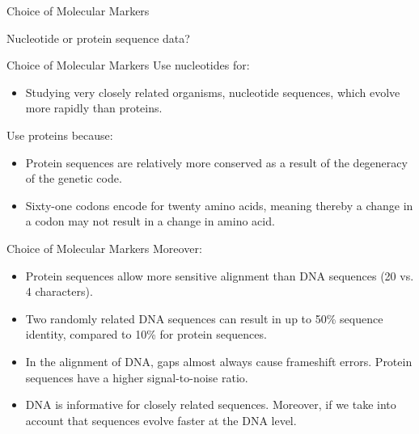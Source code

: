 \documentclass[10pt]{beamer}
\newcommand{\1}{
	\setbeamertemplate{background}{
		\texttt{[image: img/1]}
		\tikz[overlay] \fill[fill opacity=0.75,fill=white] (0,0) rectangle (-\paperwidth,\paperheight);
	}
}
\begin{document}
\begin{frame}{Choice of Molecular Markers}{}
	\begin{block}{}
		Nucleotide or protein sequence data?
	\end{block}
\end{frame}

\begin{frame}{Choice of Molecular Markers}{}
	Use nucleotides for:
	\begin{block}{}
		\begin{itemize}
			\item Studying very closely related organisms, nucleotide sequences, which
			evolve more rapidly than proteins.
		\end{itemize}
	\end{block}

	Use proteins because:
	\begin{block}{}
		\begin{itemize}
			\item Protein sequences are relatively more conserved as a result of the degeneracy of the	genetic code.
			\item Sixty-one codons encode for twenty amino acids, meaning thereby a change in a codon may not result in a change in amino acid.
		\end{itemize}
	\end{block}
\end{frame}

\begin{frame}{Choice of Molecular Markers}{}
	Moreover:
	\begin{block}{}
		\begin{itemize}
			\item Protein sequences allow more sensitive alignment than	DNA sequences (20 vs. 4 characters). \pause
			\item Two randomly related DNA sequences can result in up to 50\%
			sequence identity, compared to 10\% for protein sequences. \pause
			\item In the alignment of DNA, gaps almost always cause	frameshift errors. Protein sequences have a higher signal-to-noise ratio. \pause
			\item DNA is informative for closely related sequences. Moreover, if we take into account that  sequences evolve faster at the DNA level.
		\end{itemize}
	\end{block}
\end{frame}
\end{document}
